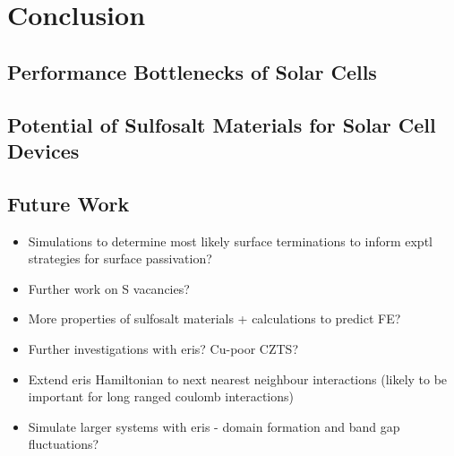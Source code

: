 
\chapter{Conclusion}

\label{ch:conclusions}

\section{Performance Bottlenecks of  \CZTS Solar Cells}
\section{Potential of Sulfosalt Materials for Solar Cell Devices}

\section{Future Work}

\begin{itemize}
\item Simulations to determine most likely surface terminations to inform exptl strategies for surface passivation?
\item Further work on S vacancies?
\item More properties of sulfosalt materials + calculations to predict FE?
\item Further investigations with eris? Cu-poor CZTS?
\item Extend eris Hamiltonian to next nearest neighbour interactions (likely to be important for long ranged coulomb interactions)
\item Simulate larger systems with eris - domain formation and band gap fluctuations?
\end{itemize}

 